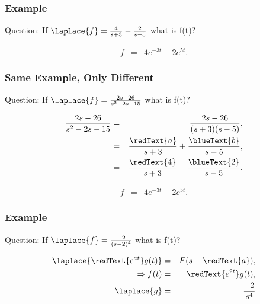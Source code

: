 \begin{frame}
  \frametitle{Example}

  \begin{block}{Question:}
    If $\laplace{f} = \frac{4}{s+3}-\frac{2}{s-5}$ what is f(t)?
  \end{block}

  {
    \begin{eqnarray*}
      f & = & 4 e^{-3t} - 2 e^{5t}.
    \end{eqnarray*}
  }

\end{frame}


\begin{frame}
  \frametitle{Same Example, Only Different}

  \begin{block}{Question:}
    If $\laplace{f} = \frac{2s-26}{s^2-2s-15}$ what is f(t)?
  \end{block}

  {
    \begin{eqnarray*}
      \frac{2s-26}{s^2-2s-15} & = & \frac{2s-26}{(s+3)(s-5)}, \\
      & = & \frac{\redText{a}}{s+3} + \frac{\blueText{b}}{s-5}, \\
      & = & \frac{\redText{4}}{s+3} - \frac{\blueText{2}}{s-5}.
    \end{eqnarray*}
  }

  {
    \begin{eqnarray*}
      f & = & 4 e^{-3t} - 2 e^{5t}.
    \end{eqnarray*}
  }


\end{frame}


\begin{frame}
  \frametitle{Example}

  \begin{block}{Question:}
    If $\laplace{f} = \frac{-2}{(s-2)^4}$ what is f(t)?
  \end{block}

  {
    \begin{eqnarray*}
      \laplace{\redText{e^{at}}g(t)} & = & F(s-\redText{a}), \\
      \Rightarrow f(t) & = & \redText{e^{2t}} g(t), \\
      \laplace{g} & = & \frac{-2}{s^4}
    \end{eqnarray*}
  }



\end{frame}


